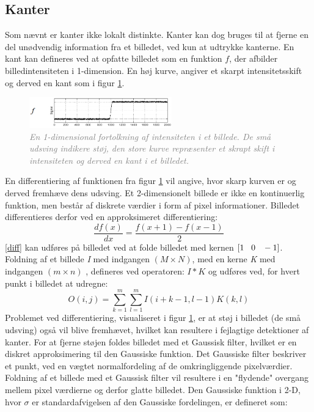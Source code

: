\subsection{Kanter}\label{subsec:kant}
Som nævnt er kanter ikke lokalt distinkte. Kanter kan dog bruges til at fjerne en del unødvendig information fra et billedet, ved kun at udtrykke kanterne.  En kant kan defineres ved at opfatte billedet som en funktion $f$, der afbilder billedintensiteten i 1-dimension. En høj kurve, angiver et skarpt intensitetsskift og derved en kant som i figur \ref{fig:kant}.
\noindent
\begin{figure}[H]
    \centering
    \includegraphics[width=0.55\textwidth]{fig/7.png}
     \vspace{-1em}
    \begin{center}        
     \caption{\textcolor{gray}{\footnotesize \textit{
     En 1-dimensional fortolkning af intensiteten i et billede. De små udsving indikere støj, den store kurve repræsenter et skrapt skift i intensiteten og derved en kant i et billedet.}}}
    \label{fig:kant}
     \end{center}
       \vspace{-2.5em}
  \end{figure}
\noindent
En differentiering af funktionen fra figur \ref{fig:kant} vil angive, hvor skarp kurven er og derved fremhæve dens udsving. Et 2-dimensionelt billede er ikke en kontinuerlig funktion, men består af diskrete værdier i form af pixel informationer.
Billedet differentieres derfor ved en approksimeret differentiering: \begin{equation}
\dfrac{df(x)}{dx}=\dfrac{f(x+1)-f(x-1)}{2}
\label{diff}
\end{equation}
\eqref{diff} kan udføres på billedet ved at folde billedet med kernen $[1 \hspace{0.3cm} 0 \hspace{0.3cm} -1]$. Foldning af et billede \emph{I} med indgangen $(M \times N)$, med en kerne \emph{K} med indgangen $(m \times n)$ , defineres ved operatoren: $I\ast K$ og udføres ved, for hvert punkt i billedet at udregne:
\begin{equation}
O(i,j) = \sum\limits_{k=1}^m \sum\limits_{l=1}^m I(i+k-1,l-1)K(k,l)
\end{equation}
Problemet ved differentiering, visualiseret i figur \ref{fig:kant}, er at støj i billedet (de små udsving) også vil blive fremhævet, hvilket kan resultere i fejlagtige detektioner af kanter. For at fjerne støjen foldes billedet med et Gaussisk filter, hvilket er en diskret approksimering til den Gaussiske funktion. Det Gaussiske filter beskriver et punkt, ved en vægtet normalfordeling af de omkringliggende pixelværdier. Foldning af et billede med et Gaussisk filter vil resultere i en "flydende" overgang mellem pixel værdierne og derfor glatte billedet.  Den Gaussiske funktion i 2-D, hvor $ \sigma $ er standardafvigelsen af den Gaussiske fordelingen, er defineret som:
